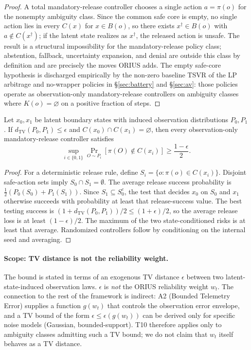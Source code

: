 \begin{proof}
A total mandatory-release controller chooses a single action $a=\pi(o)$ for the
nonempty ambiguity class.  Since the common safe core is empty, no single action lies in every $C(x)$ for
$x\in B(o)$, so there exists $x^\dagger\in B(o)$ with $a\notin C(x^\dagger)$;
if the latent state realizes as $x^\dagger$, the released action is unsafe.
The result is a structural impossibility for the mandatory-release policy
class; abstention, fallback, uncertainty expansion, and denial are outside
this class by definition and are precisely the moves ORIUS adds.  The empty
safe-core hypothesis is discharged empirically by the non-zero baseline TSVR
of the LP arbitrage and no-wrapper policies in \S\ref{sec:battery} and
\S\ref{sec:av}: those policies operate as observation-only mandatory-release
controllers on ambiguity classes where $K(o)=\varnothing$ on a positive
fraction of steps.
\end{proof}

\begin{proposition}\label{thm:T10}
Let $x_0,x_1$ be latent boundary states with induced observation
distributions $P_0,P_1$.  If $d_{\mathrm{TV}}(P_0,P_1)\le\epsilon$ and
$C(x_0)\cap C(x_1)=\varnothing$, then every observation-only mandatory-release
controller satisfies
\[
  \sup_{i\in\{0,1\}}\Pr_{O\sim P_i}\!\left[\pi(O)\notin C(x_i)\right]
  \ge \frac{1-\epsilon}{2}.
\]
\end{proposition}

\begin{proof}
For a deterministic release rule, define
$S_i=\{o:\pi(o)\in C(x_i)\}$.  Disjoint safe-action sets imply
$S_0\cap S_1=\emptyset$.  The average release success probability is
$\frac12(P_0(S_0)+P_1(S_1))$.  Since $S_1\subseteq S_0^c$, the test that
decides $x_0$ on $S_0$ and $x_1$ otherwise succeeds with probability at least
that release-success value.  The best testing success is
$(1+d_{\mathrm{TV}}(P_0,P_1))/2\le(1+\epsilon)/2$, so the average release loss
is at least $(1-\epsilon)/2$.  The maximum of the two state-conditioned risks is
at least that average.  Randomized controllers follow by conditioning on the
internal seed and averaging.
\end{proof}

\paragraph{Scope: TV distance is not the reliability weight.}
The bound is stated in terms of an exogenous TV distance $\epsilon$ between
two latent-state-induced observation laws.  $\epsilon$ is \emph{not} the ORIUS
reliability weight $w_t$.  The connection to the rest of the framework is
indirect: A2 (Bounded Telemetry Error) supplies a function $g(w_t)$ that
controls the observation error envelope, and a TV bound of the form
$\epsilon \le \epsilon(g(w_t))$ can be derived only for specific noise models
(Gaussian, bounded-support).  T10 therefore applies only to ambiguity classes
admitting such a TV bound; we do not claim that $w_t$ itself behaves as a TV
distance.

